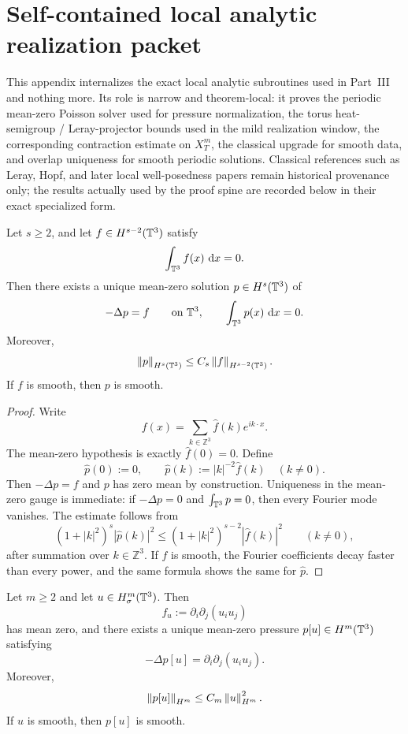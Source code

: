 \clearpage
\section{Self-contained local analytic realization packet}

This appendix internalizes the exact local analytic subroutines used in Part~III and nothing more.
Its role is narrow and theorem-local: it proves the periodic mean-zero Poisson solver used for
pressure normalization, the torus heat-semigroup / Leray-projector bounds used in the mild
realization window, the corresponding contraction estimate on $X_T^m$, the classical upgrade for
smooth data, and overlap uniqueness for smooth periodic solutions. Classical references such as
Leray, Hopf, and later local well-posedness papers remain historical provenance only; the results
actually used by the proof spine are recorded below in their exact specialized form.

\begin{manualproposition}
\label{prop:B1-mean-zero-poisson}
Let $s\ge 2$, and let $f\in H^{s-2}(\mathbb{T}^3)$ satisfy
\[
\int_{\mathbb{T}^3} f(x)\,\,\mathrm{d} x = 0.
\]
Then there exists a unique mean-zero solution $p\in H^s(\mathbb{T}^3)$ of
\[
-\Delta p = f \qquad \text{on }\mathbb{T}^3,
\qquad \int_{\mathbb{T}^3} p(x)\,\,\mathrm{d} x = 0.
\]
Moreover,
\[
\left\lVert p\right\rVert_{H^s(\mathbb{T}^3)} \le C_s \left\lVert f\right\rVert_{H^{s-2}(\mathbb{T}^3)}.
\]
If $f$ is smooth, then $p$ is smooth.
\end{manualproposition}

\begin{proof}
Write
\[
f(x)=\sum_{k\in\mathbb Z^3}\widehat f(k)e^{ik\cdot x}.
\]
The mean-zero hypothesis is exactly $\widehat f(0)=0$. Define
\[
\widehat p(0):=0,
\qquad
\widehat p(k):=|k|^{-2}\widehat f(k)\quad (k\neq 0).
\]
Then $-\Delta p=f$ and $p$ has zero mean by construction. Uniqueness in the mean-zero gauge is
immediate: if $-\Delta p=0$ and $\int_{\mathbb{T}^3}p=0$, then every Fourier mode vanishes. The estimate follows from
\[
(1+|k|^2)^s |\widehat p(k)|^2
\le
(1+|k|^2)^{s-2} |\widehat f(k)|^2
\qquad (k\neq 0),
\]
after summation over $k\in\mathbb Z^3$. If $f$ is smooth, the Fourier coefficients decay faster than
every power, and the same formula shows the same for $\widehat p$.
\end{proof}

\begin{manualcorollary}
\label{cor:B2-pressure-reconstruction}
Let $m\ge 2$ and let $u\in H^m_\sigma(\mathbb{T}^3)$. Then
\[
f_u:=\partial_i\partial_j(u_i u_j)
\]
has mean zero, and there exists a unique mean-zero pressure $p[u]\in H^m(\mathbb{T}^3)$ satisfying
\[
-\Delta p[u]=\partial_i\partial_j(u_i u_j).
\]
Moreover,
\[
\left\lVert p[u]\right\rVert_{H^m} \le C_m \left\lVert u\right\rVert_{H^m}^2.
\]
If $u$ is smooth, then $p[u]$ is smooth.
\end{manualcorollary}

